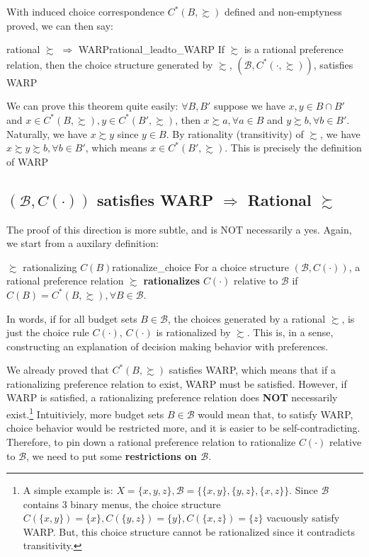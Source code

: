 With induced choice correspondence $C^*(B,\succsim)$ defined and non-emptyness proved, we can then say:
\begin{theorem}{rational $\succsim$ $\Rightarrow$ WARP}{rational_leadto_WARP}
    If $\succsim$ is a rational preference relation, then the choice structure generated by $\succsim$, $(\mathcal{B},C^*(\cdot,\succsim))$, satisfies WARP
\end{theorem}

We can prove this theorem quite easily: $\forall B,B'$ suppose we have $x,y\in B\cap B'$ and $x\in C^*(B,\succsim),y\in C^*(B',\succsim)$, then $x\succsim a, \forall a\in B$ and $y\succsim b,\forall b\in B'$. Naturally, we have $x\succsim y$ since $y\in B$. By rationality (transitivity) of $\succsim$, we have $x\succsim y\succsim b,\forall b\in B'$, which means $x\in C^*(B',\succsim)$. This is precisely the definition of WARP

\subsection*{$(\mathcal{B},C(\cdot))$ satisfies WARP $\Rightarrow$ Rational $\succsim$}
The proof of this direction is more subtle, and is NOT necessarily a yes. Again, we start from a auxilary definition:
\begin{definition}{$\succsim$ rationalizing $C(B)$}{rationalize_choice}
    For a choice structure $(\mathcal{B},C(\cdot))$, a rational preference relation $\succsim$ \textbf{rationalizes} $C(\cdot)$ relative to $\mathcal{B}$ if $C(B)=C^*(B,\succsim), \forall B\in\mathcal{B}$.
\end{definition}

In words, if for all budget sets $B\in\mathcal{B}$, the choices generated by a rational $\succsim$, is just the choice rule $C(\cdot)$, $C(\cdot)$ is rationalized by $\succsim$. This is, in a sense, constructing an explanation of decision making behavior with preferences.

We already proved that $C^*(B,\succsim)$ satisfies WARP, which means that if a rationalizing preference relation to exist, WARP must be satisfied. However, if WARP is satisfied, a rationalizing preference relation does \textbf{NOT} necessarily exist.\footnote{A simple example is: $X=\{x,y,z\},\mathcal{B}=\{\{x,y\},\{y,z\},\{x,z\}\}$. Since $\mathcal{B}$ contains 3 binary menus, the choice structure $C(\{x,y\})=\{x\},C(\{y,z\})=\{y\},C(\{x,z\})=\{z\}$ vacuously satisfy WARP. But, this choice structure cannot be rationalized since it contradicts transitivity.}
Intuitiviely, more budget sets $B\in\mathcal{B}$ would mean that, to satisfy WARP, choice behavior would be restricted more, and it is easier to be self-contradicting. Therefore, to pin down a rational preference relation to rationalize $C(\cdot)$ relative to $\mathcal{B}$, we need to put some \textbf{restrictions on $\mathcal{B}$}.


